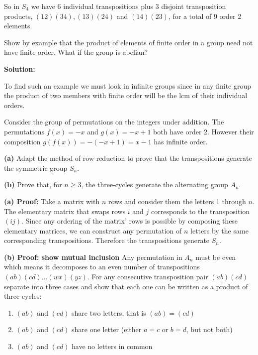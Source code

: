 \documentclass{article}
\begin{document}
So in $S_4$ we have 6 individual transpositions plus 3 disjoint transposition products, $(12)(34), (13)(24)$ and $(14)(23)$, for a total of 9 order 2 elements.

\begin{problem}
Show by example that the product of elements of finite order in a group need not have finite order. What if the group is abelian?
\end{problem}

\textbf{Solution:}

To find such an example we must look in infinite groups since in any finite group the product of two members with finite order will be the lcm of their individual orders.

Consider the group of permutations on the integers under addition. The permutations $f(x) = -x$  and $g(x) = -x + 1$ both have order 2. However their composition $g(f(x)) = -(-x + 1) = x - 1$ has infinite order.

\begin{problem}
\textbf{(a)} Adapt the method of row reduction to prove that the transpositions generate the symmetric group $S_n$.

\textbf{(b)} Prove that, for $n \geq 3$, the three-cycles generate the alternating group $A_n$.

\end{problem}

\textbf{(a) Proof:} Take a matrix with $n$ rows and consider them the letters 1 through $n$. The elementary matrix that swaps rows $i$ and $j$ corresponds to the transposition $(ij)$. Since any ordering of the matrix' rows is possible by composing these elementary matrices, we can construct any permutation of $n$ letters by the same corresponding transpositions. Therefore the transpositions generate $S_n$.

\textbf{(b) Proof: show mutual inclusion} Any permutation in $A_n$ must be even which means it decomposes to an even number of transpositions $(ab)(cd)\ldots(wx)(yz)$. For any consecutive transposition pair $(ab)(cd)$ separate into three cases and show that each one can be written as a product of three-cycles:
\begin{enumerate}
    \item $(ab)$ and $(cd)$ share two letters, that is $(ab) = (cd)$
    \item $(ab)$ and $(cd)$ share one letter (either $a = c$ or $b = d$, but not both)
    \item $(ab)$ and $(cd)$ have no letters in common
\end{enumerate}
\end{document}

